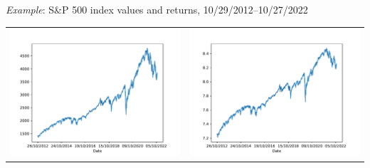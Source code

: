 \begin{frame}%
\begin{block}{\emph{Example}: S\&P 500 index values and returns, 10/29/2012--10/27/2022}
\begin{center}
\begin{tabular}{rr}
\includegraphics[height=0.3\textheight]{sp500}&\includegraphics[height=0.3\textheight]{sp500_log_price}\\

\end{tabular}
\end{center}
\end{block}
\end{frame}
